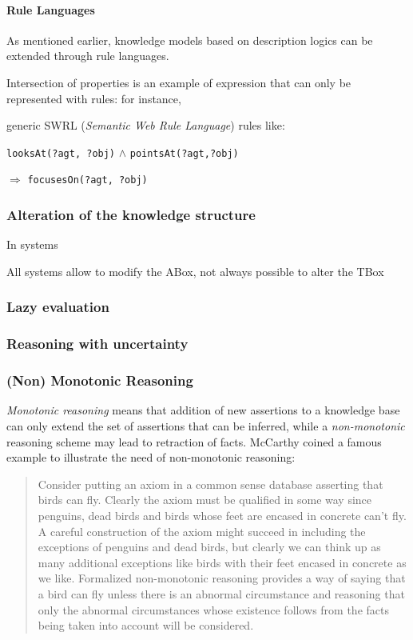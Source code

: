 \documentclass[a4paper, twocolumn]{article}
\newcommand{\concept}[1]{{\footnotesize \texttt{#1}}}
\begin{document}
\paragraph{Rule Languages}

As mentioned earlier, knowledge models based on description logics can be extended through rule languages.

Intersection of properties is an example of expression that can only be represented with rules: for instance, 

generic SWRL ({\em Semantic Web Rule Language}) rules like: \par
        \footnotesize \concept{looksAt(?agt, ?obj)} $\land$
        \concept{pointsAt(?agt,?obj)} \par $\Rightarrow$ \concept{focusesOn(?agt, ?obj)}
        \normalsize 


\subsubsection{Alteration of the knowledge structure}

In systems

All systems allow to modify the ABox, not always possible to alter the TBox


\subsubsection{Lazy evaluation}
\label{sect|lazy-evaluation}


\subsubsection{Reasoning with uncertainty}


\subsubsection{(Non) Monotonic Reasoning}

\emph{Monotonic reasoning} means that addition of new assertions to a knowledge base
can only extend the set of assertions that can be inferred, while a
\emph{non-monotonic} reasoning scheme may lead to retraction of facts.
McCarthy coined a famous example to illustrate the need of non-monotonic reasoning:

\begin{quotation}
Consider putting an axiom in a common sense database asserting that birds can
fly. Clearly the axiom must be qualified in some way since penguins, dead birds
and birds whose feet are encased in concrete can't fly. A careful construction
of the axiom might succeed in including the exceptions of penguins and dead
birds, but clearly we can think up as many additional exceptions like birds
with their feet encased in concrete as we like. Formalized non-monotonic
reasoning provides a way of saying that a bird can fly unless there
is an abnormal circumstance and reasoning that only the abnormal circumstances
whose existence follows from the facts being taken into account will be
considered.
\end{quotation}
\end{document}
